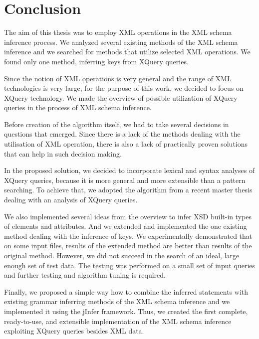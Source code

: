 \chapter{Conclusion}
The aim of this thesis was to employ XML operations in the XML schema inference process. We analyzed several existing methods of the XML schema inference and we searched for methods that utilize selected XML operations. We found only one method, inferring keys from XQuery queries.

Since the notion of XML operations is very general and the range of XML technologies is very large, for the purpose of this work, we decided to focus on XQuery technology. We made the overview of possible utilization of XQuery queries in the process of XML schema inference.

Before creation of the algorithm itself, we had to take several decisions in questions that emerged. Since there is a lack of the methods dealing with the utilisation of XML operation, there is also a lack of practically proven solutions that can help in such decision making.

In the proposed solution, we decided to incorporate lexical and syntax analyses of XQuery queries, because it is more general and more extensible than a pattern searching. To achieve that, we adopted the algorithm from a recent master thesis dealing with an analysis of XQuery queries.

We also implemented several ideas from the overview to infer XSD built-in types of elements and attributes. And we extended and implemented the one existing method dealing with the inference of keys. We experimentally demonstrated that on some input files, results of the extended method are better than results of the original method. However, we did not succeed in the search of an ideal, large enough set of test data. The testing was performed on a small set of input queries and further testing and algorithm tuning is required.

Finally, we proposed a simple way how to combine the inferred statements with existing grammar inferring methods of the XML schema inference and we implemented it using the jInfer framework. Thus, we created the first complete, ready-to-use, and extensible implementation of the XML schema inference exploiting XQuery queries besides XML data.

